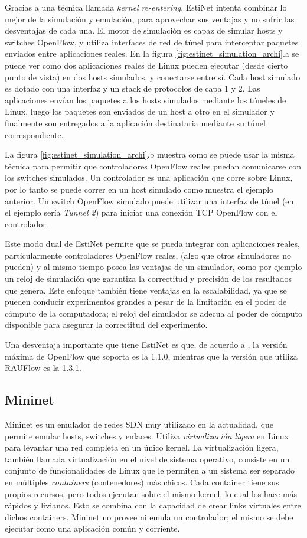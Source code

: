 Gracias a una técnica llamada \textit{kernel re-entering}, EstiNet intenta combinar lo mejor de la simulación y emulación, para aprovechar sus ventajas y no sufrir las desventajas de cada una. El motor de simulación es capaz de simular hosts y switches OpenFlow, y utiliza interfaces de red de túnel para interceptar paquetes enviados entre aplicaciones reales. En la figura \ref{fig:estinet_simulation_archi}.a se puede ver como dos aplicaciones reales de Linux pueden ejecutar (desde cierto punto de vista) en dos hosts simulados, y conectarse entre sí. Cada host simulado es dotado con una interfaz y un stack de protocolos de capa 1 y 2. Las aplicaciones envían los paquetes a los hosts simulados mediante los túneles de Linux, luego los paquetes son enviados de un host a otro en el simulador y finalmente son entregados a la aplicación destinataria mediante su túnel correspondiente.

La figura \ref{fig:estinet_simulation_archi}.b muestra como se puede usar la misma técnica para permitir que controladores OpenFlow reales puedan comunicarse con los switches simulados. Un controlador es una aplicación que corre sobre Linux, por lo tanto se puede correr en un host simulado como muestra el ejemplo anterior. Un switch OpenFlow simulado puede utilizar una interfaz de túnel (en el ejemplo sería \textit{Tunnel 2}) para iniciar una conexión TCP OpenFlow con el controlador.

Este modo dual de EstiNet permite que se pueda integrar con aplicaciones reales, particularmente controladores OpenFlow reales, (algo que otros simuladores no pueden) y al mismo tiempo posea las ventajas de un simulador, como por ejemplo un reloj de simulación que garantiza la correctitud y precisión de los resultados que genera. Este enfoque también tiene ventajas en la escalabilidad, ya que se pueden conducir experimentos grandes a pesar de la limitación en el poder de cómputo de la computadora; el reloj del simulador se adecua al poder de cómputo disponible para asegurar la correctitud del experimento.

Una desventaja importante que tiene EstiNet es que, de acuerdo a \cite{estinet}, la versión máxima de OpenFlow que soporta es la 1.1.0, mientras que la versión que utiliza RAUFlow es la 1.3.1.

\subsection{Mininet}
Mininet es un emulador de redes SDN muy utilizado en la actualidad, que permite emular hosts, switches y enlaces. Utiliza \textit{virtualización ligera} en Linux para levantar una red completa en un único kernel. La virtualización ligera, también llamada virtualización en el nivel de sistema operativo, consiste en un conjunto de funcionalidades de Linux que le permiten a un sistema ser separado en múltiples \textit{containers} (contenedores) más chicos. Cada container tiene sus propios recursos, pero todos ejecutan sobre el mismo kernel, lo cual los hace más rápidos y livianos. Esto se combina con la capacidad de crear links virtuales entre dichos containers. Mininet no provee ni emula un controlador; el mismo se debe ejecutar como una aplicación común y corriente.

